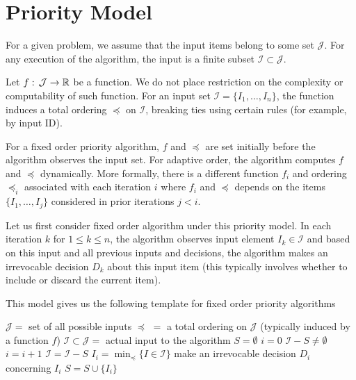 \section{Priority Model}

For a given problem, we assume that the input items belong to some set $\mathcal{J}$. For any execution of the algorithm, the input is a finite subset $\mathcal{I} \subset \mathcal{J}$.

Let $f:\,\mathcal{J} \to \mathbb{R}$ be a function. We do not place restriction on the complexity or computability of such function. For an input set $\mathcal{I} = \{I_1,\ldots,I_n\}$, the function induces a total ordering $\preceq$ on $\mathcal{I}$, breaking ties using certain rules (for example, by input ID).

For a fixed order priority algorithm, $f$ and $\preceq$ are set initially before the algorithm observes the input set. For adaptive order, the algorithm computes $f$ and $\preceq$ dynamically. More formally, there is a different function $f_i$ and ordering $\preceq_i$ associated with each iteration $i$ where $f_i$ and $\preceq$ depends on the items $\{I_1,\ldots,I_{j}\}$ considered in prior iterations $j < i$.

Let us first consider fixed order algorithm under this priority model. In each iteration $k$ for $1 \leq k \leq n$, the algorithm observes input element $I_k \in \mathcal{I}$ and based on this input and all previous inputs and decisions, the algorithm makes an irrevocable decision $D_k$ about this input item (this typically involves whether to include or discard the current item).

This model gives us the following template for fixed order priority algorithms

\begin{codebox}
    \li $\mathcal{J} =$ set of all possible inputs
    \li $\preceq\,\, = $ a total ordering on $\mathcal{J}$ (typically induced by a function $f$)
    \li $\mathcal{I} \subset \mathcal{J} = $ actual input to the algorithm
    \li $S = \emptyset$ 
    \li $i = 0$
    \li \While $\mathcal{I} - S \neq \emptyset$ \Do
        \li $i = i + 1$
        \li $\mathcal{I} = \mathcal{I} - S$
        \li $I_i = \min_{\preceq} \{ I \in \mathcal{I} \}$ 
        \li make an irrevocable decision $D_i$ concerning $I_i$ 
        \li $S = S \cup \{I_i\}$
    \End      
\end{codebox}

